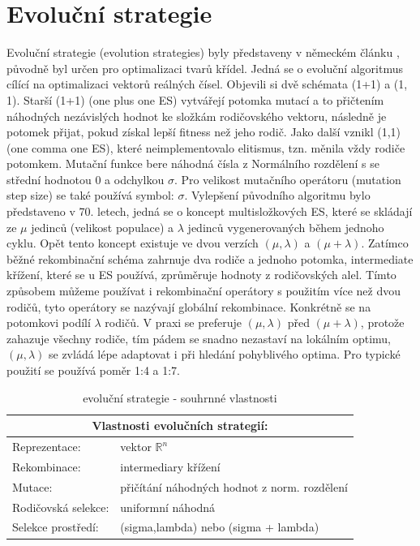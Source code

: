 \section{Evoluční strategie}
\label{sec:ES}
Evoluční strategie (evolution strategies) byly představeny v německém článku \cite{rechenberg1981evolutionsstrategie}, původně byl určen pro optimalizaci tvarů křídel. Jedná se o evoluční algoritmus cílící na optimalizaci vektorů reálných čísel. Objevili si dvě schémata (1+1) a (1, 1). Starší (1+1) (one plus one ES) vytvářejí potomka mutací a to přičtením náhodných nezávislých hodnot ke složkám rodičovského vektoru, následně je potomek přijat, pokud získal lepší fitness než jeho rodič. Jako další vznikl (1,1) (one comma one ES), které neimplementovalo elitismus, tzn. měnila vždy rodiče potomkem. Mutační funkce bere náhodná čísla z Normálního rozdělení s se střední hodnotou 0 a odchylkou $\sigma$. Pro velikost mutačního operátoru (mutation step size) se také používá symbol: $\sigma$. Vylepšení původního algoritmu bylo představeno v 70. letech, jedná se o koncept multisložkových ES, které se skládají ze $\mu$ jedinců (velikost populace) a $\lambda$ jedinců vygenerovaných během jednoho cyklu. Opět tento koncept existuje ve dvou verzích $(\mu,\lambda)$ a $(\mu + \lambda)$. Zatímco běžné rekombinační schéma zahrnuje dva rodiče a jednoho potomka, intermediate křížení, které se u ES používá, zprůměruje hodnoty z rodičovských alel. Tímto způsobem můžeme používat i rekombinační operátory s použitím více než dvou rodičů, tyto operátory se nazývají globální rekombinace. Konkrétně se na potomkovi podílí $\lambda$ rodičů. V praxi se preferuje $(\mu,\lambda)$ před $(\mu + \lambda)$, protože zahazuje všechny rodiče, tím pádem se snadno nezastaví na lokálním optimu, $(\mu,\lambda)$ se zvládá lépe adaptovat i při hledání pohyblivého optima. Pro typické použití se používá poměr 1:4 a 1:7. 
\begin{table}[h]\centering
  \begin{tabular}{ l l }
      \multicolumn{2}{c}{Vlastnosti evolučních strategií:} \\
      \hline \hline
      Reprezentace: & vektor $\mathbb{R}^n$ \\
      \hline  
      Rekombinace: & intermediary křížení \\
      \hline  
      Mutace: & přičítání náhodných hodnot z norm. rozdělení \\
      \hline   
      Rodičovská selekce: & uniformní náhodná \\
      \hline   
      Selekce prostředí: & (sigma,lambda) nebo (sigma + lambda) \\
    \end{tabular} 
\caption{evoluční strategie - souhrnné vlastnosti}
  \end{table} 

